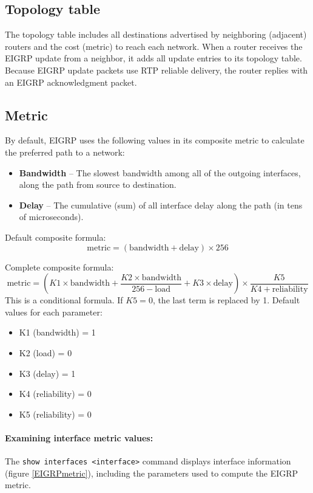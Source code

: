\subsection{Topology table}

The topology table includes all destinations advertised by neighboring (adjacent) routers and the cost (metric) to reach each network. When a router receives the EIGRP update from a neighbor, it adds all update entries to its topology table. Because EIGRP update packets use RTP reliable delivery, the router replies with an EIGRP acknowledgment packet.

\subsection{Metric}

By default, EIGRP uses the following values in its composite metric to calculate the preferred path to a network:

\begin{itemize}
\item \textbf{Bandwidth} -- The slowest bandwidth among all of the outgoing interfaces, along the path from source to destination.
\item \textbf{Delay} -- The cumulative (sum) of all interface delay along the path (in tens of microseconds).
\end{itemize}

Default composite formula:
\[ \text{metric} = \left( \text{bandwidth} + \text{delay} \right) \times 256 \]

Complete composite formula:
\[ \text{metric} = \left( K1\times\text{bandwidth} + \frac{K2\times\text{bandwidth}}{256 - \text{load}} + K3\times\text{delay} \right) \times \frac{K5}{K4+\text{reliability}}\]
This is a conditional formula. If $K5=0$, the last term is replaced by 1. Default values for each parameter:

\begin{itemize}
\item K1 (bandwidth) = 1
\item K2 (load) = 0
\item K3 (delay) = 1
\item K4 (reliability) = 0
\item K5 (reliability) = 0
\end{itemize}

\paragraph{Examining interface metric values:} The \verb|show interfaces <interface>| command displays interface information (figure \ref{EIGRPmetric}), including the parameters used to compute the EIGRP metric.

